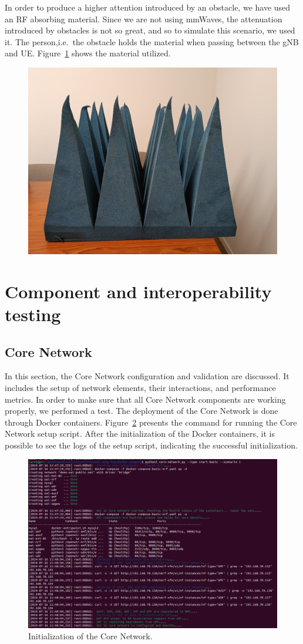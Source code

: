 In order to produce a higher attention introduced by an obstacle, we have used an RF absorbing material.
Since we are not using mmWaves, the attenuation introduced by obstacles is not so great, and so to simulate this scenario, we used it.
The person,i.e.\ the obstacle holds the material when passing between the gNB and UE\@.
Figure~\ref{fig:foam} shows the material utilized.

\begin{figure}[H]
    \centering
    \includegraphics[width=0.5\linewidth]{figures/foam}
    \caption{}
    \label{fig:foam}
\end{figure}



\section{Component and interoperability testing}\label{sec:component-testing}


\subsection{Core Network}\label{subsec:core_network}
In this section, the Core Network configuration and validation are discussed.
It includes the setup of network elements, their interactions, and performance metrics.
In order to make sure that all Core Network components are working properly, we performed a test.
The deployment of the Core Network is done through Docker containers.
Figure~\ref{fig:core_init} presents the command for running the Core Network setup script.
After the initialization of the Docker containers, it is possible to see the logs of the setup script, indicating the successful initialization.

\begin{figure}[H]
    \centering
    \includegraphics[width=0.5\linewidth]{figures/core_init}
    \caption[Initialization of the Core Network]{Initialization of the Core Network.}
    \label{fig:core_init}
\end{figure}

